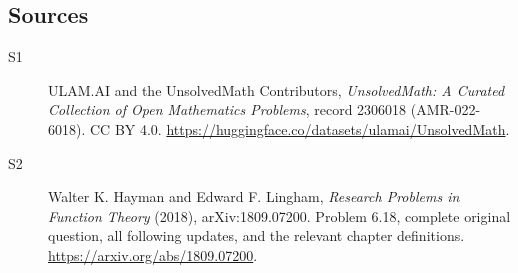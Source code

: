 \documentclass[11pt]{book}
\begin{document}
\subsection{Sources}
\begin{description}
\item[\hypertarget{source:2306018:1}{S1}] ULAM.AI and the UnsolvedMath Contributors, \emph{UnsolvedMath: A Curated Collection of Open Mathematics Problems}, record 2306018 (AMR-022-6018). CC BY 4.0. \url{https://huggingface.co/datasets/ulamai/UnsolvedMath}.
\item[\hypertarget{source:2306018:2}{S2}] Walter K. Hayman and Edward F. Lingham, \emph{Research Problems in Function Theory} (2018), arXiv:1809.07200. Problem 6.18, complete original question, all following updates, and the relevant chapter definitions. \url{https://arxiv.org/abs/1809.07200}.
\end{description}
\label{end:2306018}
\end{document}
